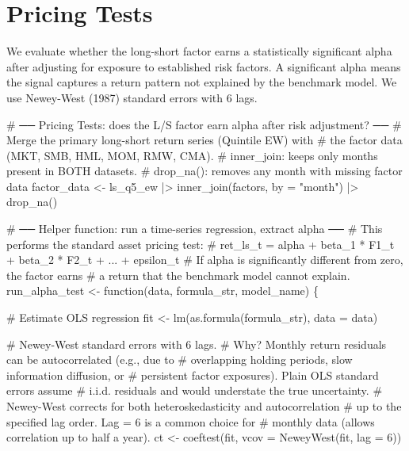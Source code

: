 \documentclass[
  letterpaper,
  DIV=11,
  numbers=noendperiod]{scrartcl}
\newenvironment{Shaded}{\begin{snugshade}}{\end{snugshade}}
\newcommand{\AttributeTok}[1]{\textcolor[rgb]{0.40,0.45,0.13}{#1}}
\newcommand{\CommentTok}[1]{\textcolor[rgb]{0.37,0.37,0.37}{#1}}
\newcommand{\ControlFlowTok}[1]{\textcolor[rgb]{0.00,0.23,0.31}{#1}}
\newcommand{\DecValTok}[1]{\textcolor[rgb]{0.68,0.00,0.00}{#1}}
\newcommand{\FunctionTok}[1]{\textcolor[rgb]{0.28,0.35,0.67}{#1}}
\newcommand{\NormalTok}[1]{\textcolor[rgb]{0.00,0.23,0.31}{#1}}
\newcommand{\OtherTok}[1]{\textcolor[rgb]{0.00,0.23,0.31}{#1}}
\newcommand{\SpecialCharTok}[1]{\textcolor[rgb]{0.37,0.37,0.37}{#1}}
\newcommand{\StringTok}[1]{\textcolor[rgb]{0.13,0.47,0.30}{#1}}
\begin{document}
\section{Pricing Tests}\label{pricing-tests}

We evaluate whether the long-short factor earns a statistically
significant alpha after adjusting for exposure to established risk
factors. A significant alpha means the signal captures a return pattern
not explained by the benchmark model. We use Newey-West (1987) standard
errors with 6 lags.

\begin{Shaded}
\begin{Highlighting}[]
\CommentTok{\# ── Pricing Tests: does the L/S factor earn alpha after risk adjustment? ──}
\CommentTok{\# Merge the primary long{-}short return series (Quintile EW) with}
\CommentTok{\# the factor data (MKT, SMB, HML, MOM, RMW, CMA).}
\CommentTok{\# inner\_join: keeps only months present in BOTH datasets.}
\CommentTok{\# drop\_na(): removes any month with missing factor data}
\NormalTok{factor\_data }\OtherTok{\textless{}{-}}\NormalTok{ ls\_q5\_ew }\SpecialCharTok{|\textgreater{}}
  \FunctionTok{inner\_join}\NormalTok{(factors, }\AttributeTok{by =} \StringTok{"month"}\NormalTok{) }\SpecialCharTok{|\textgreater{}}
  \FunctionTok{drop\_na}\NormalTok{()}

\CommentTok{\# ── Helper function: run a time{-}series regression, extract alpha ──}
\CommentTok{\# This performs the standard asset pricing test:}
\CommentTok{\# ret\_ls\_t = alpha + beta\_1 * F1\_t + beta\_2 * F2\_t + ... + epsilon\_t}
\CommentTok{\# If alpha is significantly different from zero, the factor earns}
\CommentTok{\# a return that the benchmark model cannot explain.}
\NormalTok{run\_alpha\_test }\OtherTok{\textless{}{-}} \ControlFlowTok{function}\NormalTok{(data, formula\_str, model\_name) \{}
  
  \CommentTok{\# Estimate OLS regression}
\NormalTok{  fit }\OtherTok{\textless{}{-}} \FunctionTok{lm}\NormalTok{(}\FunctionTok{as.formula}\NormalTok{(formula\_str), }\AttributeTok{data =}\NormalTok{ data)}
  
  \CommentTok{\# Newey{-}West standard errors with 6 lags.}
  \CommentTok{\# Why? Monthly return residuals can be autocorrelated (e.g., due to}
  \CommentTok{\# overlapping holding periods, slow information diffusion, or}
  \CommentTok{\# persistent factor exposures). Plain OLS standard errors assume}
  \CommentTok{\# i.i.d. residuals and would understate the true uncertainty.}
  \CommentTok{\# Newey{-}West corrects for both heteroskedasticity and autocorrelation}
  \CommentTok{\# up to the specified lag order. Lag = 6 is a common choice for}
  \CommentTok{\# monthly data (allows correlation up to half a year).}
\NormalTok{  ct }\OtherTok{\textless{}{-}} \FunctionTok{coeftest}\NormalTok{(fit, }\AttributeTok{vcov =} \FunctionTok{NeweyWest}\NormalTok{(fit, }\AttributeTok{lag =} \DecValTok{6}\NormalTok{))}
  

\end{Highlighting}
\end{Shaded}
\end{document}

